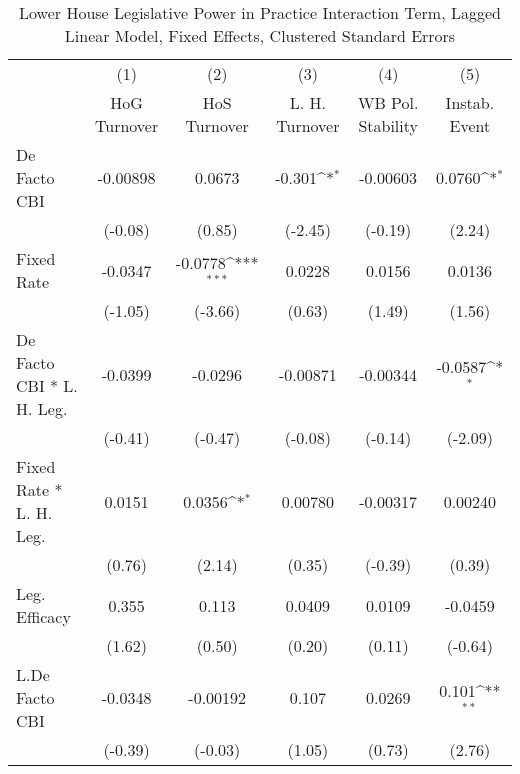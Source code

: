 {
\def\sym#1{\ifmmode^{#1}\else\(^{#1}\)\fi}
\begin{longtable}{l*{5}{c}}
\caption{Lower House Legislative Power in Practice Interaction Term, Lagged Linear Model, Fixed Effects, Clustered Standard Errors \label{llpintlagsDF}}\\
\hline\hline\endfirsthead\hline\endhead\hline\endfoot\endlastfoot
                &\multicolumn{1}{c}{(1)}&\multicolumn{1}{c}{(2)}&\multicolumn{1}{c}{(3)}&\multicolumn{1}{c}{(4)}&\multicolumn{1}{c}{(5)}\\
                &\multicolumn{1}{c}{HoG Turnover}&\multicolumn{1}{c}{HoS Turnover}&\multicolumn{1}{c}{L. H. Turnover}&\multicolumn{1}{c}{WB Pol. Stability}&\multicolumn{1}{c}{Instab. Event}\\
\hline
De Facto CBI    & -0.00898         &   0.0673         &   -0.301\sym{*}  & -0.00603         &   0.0760\sym{*}  \\
                &  (-0.08)         &   (0.85)         &  (-2.45)         &  (-0.19)         &   (2.24)         \\
[1em]
Fixed Rate      &  -0.0347         &  -0.0778\sym{***}&   0.0228         &   0.0156         &   0.0136         \\
                &  (-1.05)         &  (-3.66)         &   (0.63)         &   (1.49)         &   (1.56)         \\
[1em]
De Facto CBI * L. H. Leg.&  -0.0399         &  -0.0296         & -0.00871         & -0.00344         &  -0.0587\sym{*}  \\
                &  (-0.41)         &  (-0.47)         &  (-0.08)         &  (-0.14)         &  (-2.09)         \\
[1em]
Fixed Rate * L. H. Leg.&   0.0151         &   0.0356\sym{*}  &  0.00780         & -0.00317         &  0.00240         \\
                &   (0.76)         &   (2.14)         &   (0.35)         &  (-0.39)         &   (0.39)         \\
[1em]
Leg. Efficacy   &    0.355         &    0.113         &   0.0409         &   0.0109         &  -0.0459         \\
                &   (1.62)         &   (0.50)         &   (0.20)         &   (0.11)         &  (-0.64)         \\
[1em]
L.De Facto CBI  &  -0.0348         & -0.00192         &    0.107         &   0.0269         &    0.101\sym{**} \\
                &  (-0.39)         &  (-0.03)         &   (1.05)         &   (0.73)         &   (2.76)         \\

\end{longtable}}
